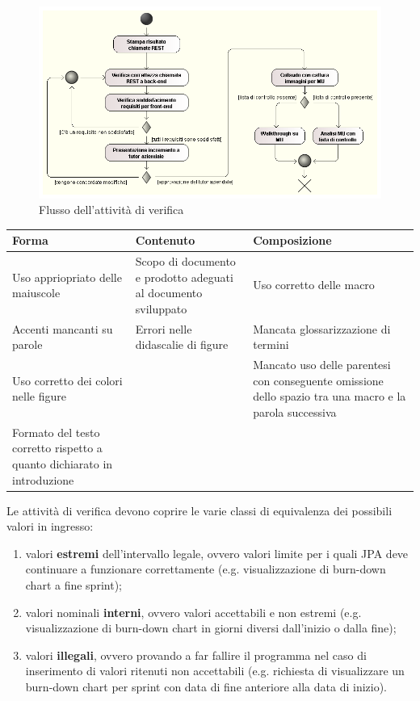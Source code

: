 \begin{figure}[H]%
\centering
\includegraphics[width=1.2\columnwidth]{immagini/verification-flow}
\caption{Flusso dell'attività di verifica}
\label{fig:flow-verification}%
\end{figure}

\begin{tabular}{ | p{4cm} | p{4cm} | p{4cm} | }

\hline
\textbf{Forma} & \textbf{Contenuto} & \textbf{Composizione} \\
\hline
Uso appriopriato delle maiuscole &
Scopo di documento e prodotto adeguati al documento sviluppato &
Uso corretto delle macro  \\
\hline
Accenti mancanti su parole &
Errori nelle didascalie di figure &
Mancata glossarizzazione di termini \\
\hline
Uso corretto dei colori nelle figure &
&
Mancato uso delle parentesi con conseguente omissione dello spazio tra una
macro e la parola successiva \\
\hline
Formato del testo corretto rispetto a quanto dichiarato in introduzione &
&
 \\
\hline
\end{tabular}
\label{tab:inspection}

Le attività di verifica devono coprire le varie classi di equivalenza dei
possibili valori in ingresso:

\begin{enumerate}
\item valori \textbf{estremi} dell'intervallo legale, ovvero valori limite per
  i quali JPA deve continuare a funzionare correttamente (e.g. visualizzazione
  di burn-down chart a fine sprint);
\item valori nominali \textbf{interni}, ovvero valori accettabili e non
  estremi (e.g. visualizzazione di burn-down chart in giorni diversi
  dall'inizio o dalla fine);
\item valori \textbf{illegali}, ovvero provando a far fallire il programma nel
  caso di inserimento di valori ritenuti non accettabili (e.g. richiesta di
  visualizzare un burn-down chart per sprint con data di fine anteriore alla
  data di inizio).
\end{enumerate}

